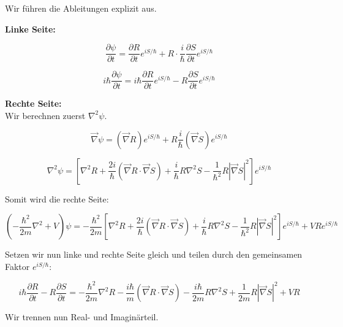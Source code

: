 Wir führen die Ableitungen explizit aus.

\textbf{Linke Seite:}

\begin{equation}
    \frac{\partial \psi}{\partial t} = \frac{\partial R}{\partial t} e^{iS/\hbar} + R \cdot \frac{i}{\hbar} \frac{\partial S}{\partial t} e^{iS/\hbar}
\end{equation}

\begin{equation}
    i\hbar \frac{\partial \psi}{\partial t} = i\hbar \frac{\partial R}{\partial t} e^{iS/\hbar} - R \frac{\partial S}{\partial t} e^{iS/\hbar}
\end{equation}

\textbf{Rechte Seite:}\\
Wir berechnen zuerst $\nabla^2 \psi$.

\begin{equation}
    \vec{\nabla} \psi = (\vec{\nabla} R) e^{iS/\hbar} + R \frac{i}{\hbar} (\vec{\nabla} S) e^{iS/\hbar}
\end{equation}

\begin{equation}
    \nabla^2 \psi = \left[ \nabla^2 R + \frac{2i}{\hbar} (\vec{\nabla} R \cdot \vec{\nabla} S) + \frac{i}{\hbar} R \nabla^2 S - \frac{1}{\hbar^2} R \left| \vec{\nabla} S \right|^2 \right] e^{iS/\hbar}
\end{equation}

Somit wird die rechte Seite:

\begin{equation}
    \left( -\frac{\hbar^2}{2m} \nabla^2 + V \right) \psi = -\frac{\hbar^2}{2m} \left[ \nabla^2 R + \frac{2i}{\hbar} (\vec{\nabla} R \cdot \vec{\nabla} S) + \frac{i}{\hbar} R \nabla^2 S - \frac{1}{\hbar^2} R \left| \vec{\nabla} S \right|^2 \right] e^{iS/\hbar} + V R e^{iS/\hbar}
\end{equation}

Setzen wir nun linke und rechte Seite gleich und teilen durch den gemeinsamen Faktor $e^{iS/\hbar}$:

\begin{equation}
    i\hbar \frac{\partial R}{\partial t} - R \frac{\partial S}{\partial t} = -\frac{\hbar^2}{2m} \nabla^2 R - \frac{i\hbar}{m} (\vec{\nabla} R \cdot \vec{\nabla} S) - \frac{i\hbar}{2m} R \nabla^2 S + \frac{1}{2m} R \left| \vec{\nabla} S \right|^2 + V R
\end{equation}

Wir trennen nun Real- und Imaginärteil.


